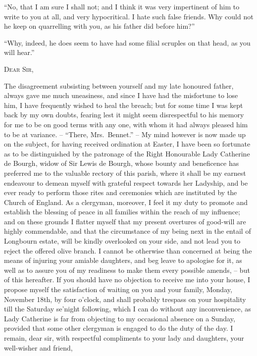 “No, that I am sure I shall not; and I think it was
very impertinent of him to write to you at all, and very
hypocritical. I hate such false friends. Why could not
he keep on quarrelling with you, as his father did before
him?”

“Why, indeed, he does seem to have had some filial
scruples on that head, as you will hear.”

\begin{letter}

\textsc{Dear Sir},

The disagreement subsisting between yourself and
my late honoured father, always gave me much uneasiness,
and since I have had the misfortune to lose him, I have
frequently wished to heal the breach; but for some time
I was kept back by my own doubts, fearing lest it might
seem disrespectful to his memory for me to be on good
terms with any one, with whom it had always pleased
him to be at variance. -- “There, Mrs.\ Bennet.” -- My mind
however is now made up on the subject, for having received
ordination at Easter, I have been so fortunate as to be
distinguished by the patronage of the Right Honourable
Lady Catherine de Bourgh, widow of Sir Lewis de Bourgh,
whose bounty and beneficence has preferred me to the
valuable rectory of this parish, where it shall be my
earnest endeavour to demean myself with grateful respect
towards her Ladyship, and be ever ready to perform those
rites and ceremonies which are instituted by the Church
of England. As a clergyman, moreover, I feel it my duty
to promote and establish the blessing of peace in all families
within the reach of my influence; and on these grounds
I flatter myself that my present overtures of good-will
are highly commendable, and that the circumstance of
my being next in the entail of Longbourn estate, will be
kindly overlooked on your side, and not lead you to reject
the offered olive branch. I cannot be otherwise than
concerned at being the means of injuring your amiable
daughters, and beg leave to apologise for it, as well as to
assure you of my readiness to make them every possible
amends, -- but of this hereafter. If you should have no
objection to receive me into your house, I propose myself
the satisfaction of waiting on you and your family,
Monday, November 18th, by four o’clock, and shall
probably trespass on your hospitality till the Saturday
se’night following, which I can do without any inconvenience,
as Lady Catherine is far from objecting to
my occasional absence on a Sunday, provided that some
other clergyman is engaged to do the duty of the day.
I remain, dear sir, with respectful compliments to your
lady and daughters, your well-wisher and friend,

\end{letter}

